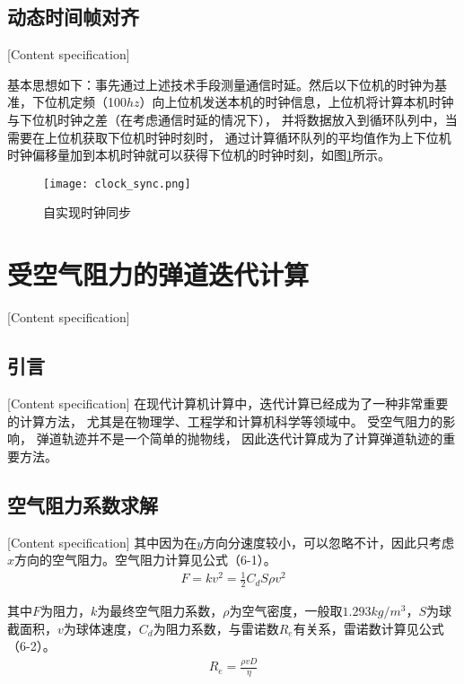 \subsection{动态时间帧对齐}[Content specification]

基本思想如下：事先通过上述技术手段测量通信时延。然后以下位机的时钟为基准，下位机定频（100$hz$）向上位机发送本机的时钟信息，上位机将计算本机时钟与下位机时钟之差（在考虑通信时延的情况下），
并将数据放入到循环队列中，当需要在上位机获取下位机时钟时刻时，
通过计算循环队列的平均值作为上下位机时钟偏移量加到本机时钟就可以获得下位机的时钟时刻，如图\ref{clock_sync}所示。

\begin{figure}[H]
    \centering
    \texttt{[image: clock\_sync.png]} 
    \caption{自实现时钟同步} 
    \label{clock_sync}
\end{figure}




\section{受空气阻力的弹道迭代计算}[Content specification]


\subsection{引言}[Content specification]
在现代计算机计算中，迭代计算已经成为了一种非常重要的计算方法，
尤其是在物理学、工程学和计算机科学等领域中。
受空气阻力的影响，
弹道轨迹并不是一个简单的抛物线，
因此迭代计算成为了计算弹道轨迹的重要方法。


\subsection{空气阻力系数求解}[Content specification]
其中因为在$y$⽅向分速度较⼩，可以忽略不计，因此只考虑$x$⽅向的空⽓阻⼒。空气阻力计算见公式（6-1）。
\begin{gather}
    F = kv^2 =  \frac{1}{2} C_dS \rho  v^2
\end{gather}

\par

其中$F$为阻力，$k$为最终空气阻力系数，$\rho$为空气密度，一般取$1.293kg/m^3$，$S$为球截面积，$v$为球体速度，$C_d$为阻力系数，与雷诺数$R_e$有关系，雷诺数计算见公式（6-2）。
\begin{gather}
    R_e = \frac{\rho v D}{\eta}
\end{gather}

